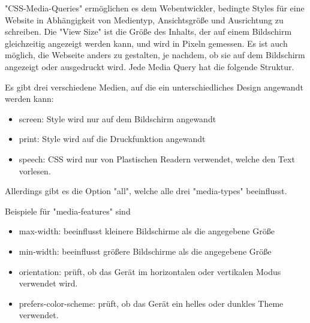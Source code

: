 \label{sec:mediaQueries}

"CSS-Media-Queries" ermöglichen es dem Webentwickler, bedingte Styles für eine Website in Abhängigkeit von Medientyp, Ansichtsgröße und Ausrichtung zu schreiben. Die "View Size" ist die Größe des Inhalts, der auf einem Bildschirm gleichzeitig angezeigt werden kann, und wird in Pixeln gemessen. Es ist auch möglich, die Webseite anders zu gestalten, je nachdem, ob sie auf dem Bildschirm angezeigt oder ausgedruckt wird. Jede Media Query hat die folgende Struktur. 


Es gibt drei verschiedene Medien, auf die ein unterschiedliches Design angewandt werden kann: 
\begin{itemize}
    \item screen: Style wird nur auf dem Bildschirm angewandt
    \item print: Style wird auf die Druckfunktion angewandt 
    \item speech: CSS wird nur von Plastischen Readern verwendet, welche den Text vorlesen. 
\end{itemize}

Allerdings gibt es die Option "all", welche alle drei "media-types" beeinflusst. \cite{w3MediaQueries}

Beispiele für "media-features" sind

\begin{itemize}
    \item max-width: beeinflusst kleinere Bildschirme als die angegebene Größe
    \item min-width: beeinflusst größere Bildschirme als die angegebene Größe 
    \item orientation: prüft, ob das Gerät im horizontalen oder vertikalen Modus verwendet wird.
    \item prefers-color-scheme: prüft, ob das Gerät ein helles oder dunkles Theme verwendet.
\end{itemize}
